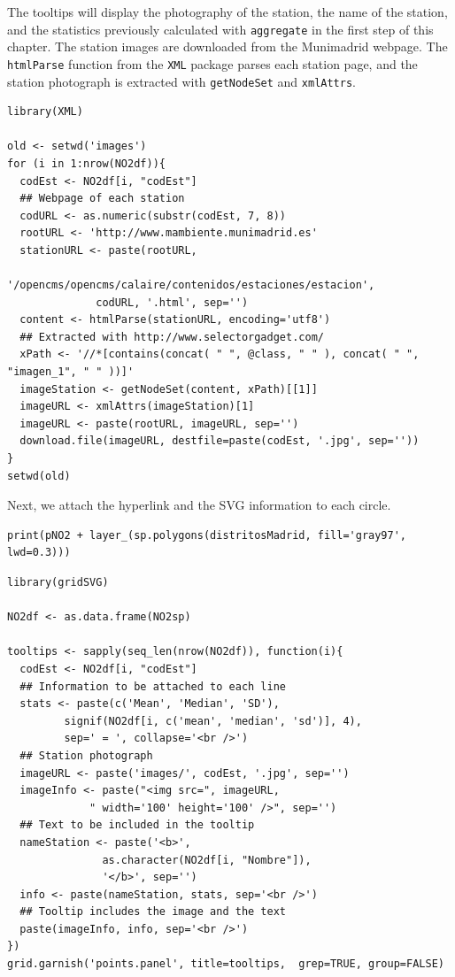 The tooltips will display the photography of the station, the name of
the station, and the statistics previously calculated with \texttt{aggregate}
in the first step of this chapter.  The station images are downloaded
from the Munimadrid webpage. The \texttt{htmlParse} function from the \texttt{XML}
package parses each station page, and the station photograph is
extracted with \texttt{getNodeSet} and \texttt{xmlAttrs}.


\lstset{language=R,numbers=none}
\begin{lstlisting}
library(XML)

old <- setwd('images')
for (i in 1:nrow(NO2df)){
  codEst <- NO2df[i, "codEst"]
  ## Webpage of each station
  codURL <- as.numeric(substr(codEst, 7, 8))
  rootURL <- 'http://www.mambiente.munimadrid.es'
  stationURL <- paste(rootURL,
		      '/opencms/opencms/calaire/contenidos/estaciones/estacion',
		      codURL, '.html', sep='')
  content <- htmlParse(stationURL, encoding='utf8')
  ## Extracted with http://www.selectorgadget.com/
  xPath <- '//*[contains(concat( " ", @class, " " ), concat( " ", "imagen_1", " " ))]'
  imageStation <- getNodeSet(content, xPath)[[1]]
  imageURL <- xmlAttrs(imageStation)[1]
  imageURL <- paste(rootURL, imageURL, sep='')
  download.file(imageURL, destfile=paste(codEst, '.jpg', sep=''))
}
setwd(old)
\end{lstlisting}

Next, we attach the hyperlink and the SVG information to each
circle.



\lstset{language=R,numbers=none}
\begin{lstlisting}
print(pNO2 + layer_(sp.polygons(distritosMadrid, fill='gray97', lwd=0.3)))
\end{lstlisting}

\lstset{language=R,numbers=none}
\begin{lstlisting}
library(gridSVG)

NO2df <- as.data.frame(NO2sp)

tooltips <- sapply(seq_len(nrow(NO2df)), function(i){
  codEst <- NO2df[i, "codEst"]
  ## Information to be attached to each line
  stats <- paste(c('Mean', 'Median', 'SD'),
		 signif(NO2df[i, c('mean', 'median', 'sd')], 4),
		 sep=' = ', collapse='<br />')
  ## Station photograph 
  imageURL <- paste('images/', codEst, '.jpg', sep='')
  imageInfo <- paste("<img src=", imageURL,
		     " width='100' height='100' />", sep='')
  ## Text to be included in the tooltip
  nameStation <- paste('<b>', 
		       as.character(NO2df[i, "Nombre"]),
		       '</b>', sep='')
  info <- paste(nameStation, stats, sep='<br />')
  ## Tooltip includes the image and the text
  paste(imageInfo, info, sep='<br />')
})
grid.garnish('points.panel', title=tooltips,  grep=TRUE, group=FALSE)
\end{lstlisting}



